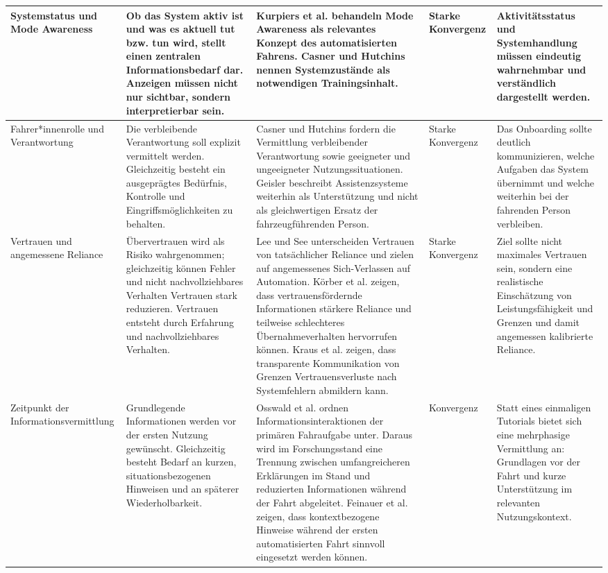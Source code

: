 {\begin{xltabular}{\textwidth}{
    |P{2.4cm}
    |P{2.8cm}
    |Y
    |P{1.8cm}
    |P{2.6cm}|
}
Systemstatus und Mode Awareness &
Ob das System aktiv ist und was es aktuell tut bzw. tun wird, stellt einen
zentralen Informationsbedarf dar. Anzeigen müssen nicht nur sichtbar, sondern
interpretierbar sein. &
Kurpiers et al. \cite{kurpiers2020mode} behandeln Mode Awareness als relevantes Konzept des
automatisierten Fahrens. Casner und Hutchins \cite{casner2019we} nennen Systemzustände als
notwendigen Trainingsinhalt. &
Starke Konvergenz &
Aktivitätsstatus und Systemhandlung müssen eindeutig wahrnehmbar und
verständlich dargestellt werden.
\\
\hline

Fahrer*innenrolle und Verantwortung &
Die verbleibende Verantwortung soll explizit vermittelt werden. Gleichzeitig
besteht ein ausgeprägtes Bedürfnis, Kontrolle und Eingriffsmöglichkeiten zu
behalten. &
Casner und Hutchins \cite{casner2019we} fordern die Vermittlung verbleibender Verantwortung
sowie geeigneter und ungeeigneter Nutzungssituationen. Geisler \cite{Geisler_autonom2021}
beschreibt Assistenzsysteme weiterhin als Unterstützung und nicht als
gleichwertigen Ersatz der fahrzeugführenden Person. &
Starke Konvergenz &
Das Onboarding sollte deutlich kommunizieren, welche Aufgaben das System
übernimmt und welche weiterhin bei der fahrenden Person verbleiben.
\\
\hline

Vertrauen und angemessene Reliance &
Übervertrauen wird als Risiko wahrgenommen; gleichzeitig können Fehler und
nicht nachvollziehbares Verhalten Vertrauen stark reduzieren. Vertrauen
entsteht durch Erfahrung und nachvollziehbares Verhalten. &
Lee und See \cite{lee2004trust} unterscheiden Vertrauen von tatsächlicher Reliance und zielen
auf angemessenes Sich-Verlassen auf Automation. Körber et al. \cite{korber2018introduction} zeigen,
dass vertrauensfördernde Informationen stärkere Reliance und teilweise
schlechteres Übernahmeverhalten hervorrufen können. Kraus et al. \cite{kraus2020more}
zeigen, dass transparente Kommunikation von Grenzen Vertrauensverluste nach
Systemfehlern abmildern kann. &
Starke Konvergenz &
Ziel sollte nicht maximales Vertrauen sein, sondern eine realistische
Einschätzung von Leistungsfähigkeit und Grenzen und damit angemessen
kalibrierte Reliance.
\\
\hline

Zeitpunkt der Informationsvermittlung &
Grundlegende Informationen werden vor der ersten Nutzung gewünscht.
Gleichzeitig besteht Bedarf an kurzen, situationsbezogenen Hinweisen und an
späterer Wiederholbarkeit. &
Osswald et al. \cite{osswald2012predicting} ordnen Informationsinteraktionen der primären Fahraufgabe
unter. Daraus wird im Forschungsstand eine Trennung zwischen umfangreicheren
Erklärungen im Stand und reduzierten Informationen während der Fahrt
abgeleitet. Feinauer et al. \cite{feinauer2023first} zeigen, dass kontextbezogene Hinweise
während der ersten automatisierten Fahrt sinnvoll eingesetzt werden können. &
Konvergenz &
Statt eines einmaligen Tutorials bietet sich eine mehrphasige Vermittlung an:
Grundlagen vor der Fahrt und kurze Unterstützung im relevanten
Nutzungskontext.
\\
\hline


\end{xltabular}}
